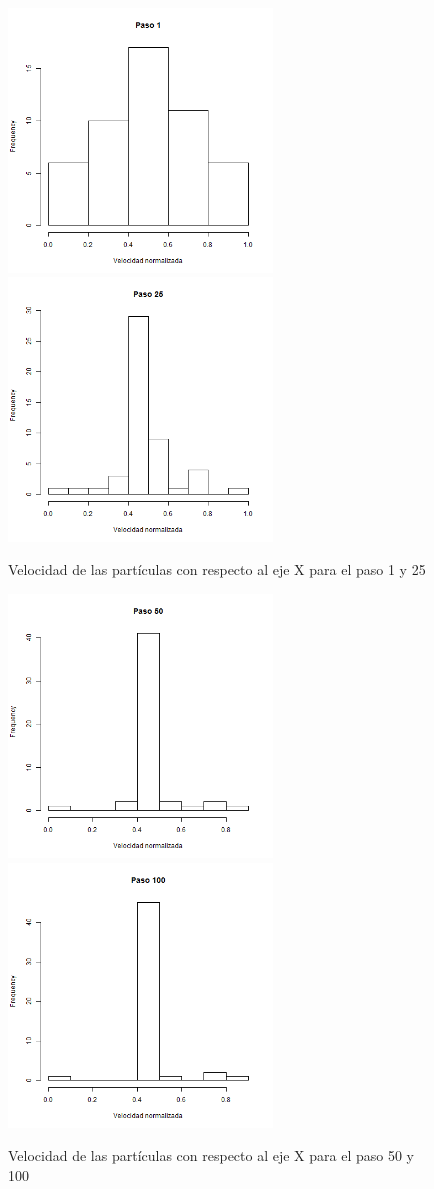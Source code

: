 \documentclass{article}
\begin{document}
\begin{figure}[H]
\centering
\includegraphics[width=7cm]{histx_001.png} \includegraphics[width=7cm]{histx_025.png}
\caption{Velocidad de las partículas con respecto al eje X para el paso 1 y 25}
\end{figure}
\begin{figure}[H]
\centering
\includegraphics[width=7cm]{histx_050.png} \includegraphics[width=7cm]{histx_100.png}
\caption{Velocidad de las partículas con respecto al eje X para el paso 50 y 100}
\end{figure}
\end{document}
